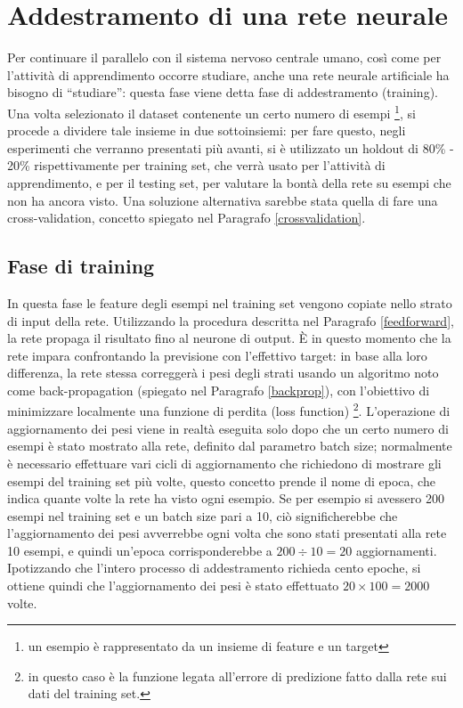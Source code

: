 \documentclass[12pt]{report}
\begin{document}
\section{Addestramento di una rete neurale}
Per continuare il parallelo con il sistema nervoso centrale umano, così come per l'attività di apprendimento occorre studiare, anche una rete neurale artificiale ha bisogno di ``studiare'': questa fase viene detta fase di addestramento (training).
Una volta selezionato il dataset contenente un certo numero di esempi \footnote{un esempio è rappresentato da un insieme di feature e un target}, si procede a dividere tale insieme in due sottoinsiemi: per fare questo, negli esperimenti che verranno presentati più avanti, si è utilizzato un holdout di 80\% - 20\% rispettivamente per training set, che verrà usato per l'attività di apprendimento, e per il testing set, per valutare la bontà della rete su esempi che non ha ancora visto.
Una soluzione alternativa sarebbe stata quella di fare una cross-validation, concetto spiegato nel Paragrafo \ref{crossvalidation}.

\subsection{Fase di training}
In questa fase le feature degli esempi nel training set vengono copiate nello strato di input della rete. Utilizzando la procedura descritta nel Paragrafo \ref{feedforward}, la rete propaga il risultato fino al neurone di output. È in questo momento che la rete impara confrontando la previsione con l’effettivo target: in base alla loro differenza, la rete stessa correggerà i pesi degli strati usando un algoritmo noto come back-propagation (spiegato nel Paragrafo \ref{backprop}), con l'obiettivo di minimizzare localmente una funzione di perdita \label{loss} (loss function) \footnote{in questo caso è la funzione legata all'errore di predizione fatto dalla rete sui dati del training set.}.
L'operazione di aggiornamento dei pesi viene in realtà eseguita solo dopo che un certo numero di esempi è stato mostrato alla rete, definito dal parametro batch size; normalmente è necessario effettuare vari cicli di aggiornamento che richiedono di mostrare gli esempi del training set più volte, questo concetto prende il nome di epoca, che indica quante volte la rete ha visto ogni esempio.
Se per esempio si avessero 200 esempi nel training set e un batch size pari a 10, ciò significherebbe che l'aggiornamento dei pesi avverrebbe ogni volta che sono stati presentati alla rete 10 esempi, e
quindi un'epoca corrisponderebbe a $200 \div 10 = 20$ aggiornamenti. Ipotizzando che l'intero processo di addestramento richieda cento epoche, si ottiene quindi che l'aggiornamento dei pesi è stato effettuato $20 \times 100 = 2000$ volte.
\end{document}
